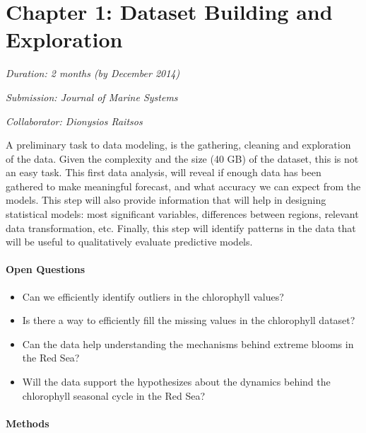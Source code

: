 \section{Chapter 1: Dataset Building and Exploration}

\noindent \emph{Duration: 2 months (by December 2014)}

\noindent \emph{Submission: Journal of Marine Systems}

\noindent \emph{Collaborator: Dionysios Raitsos}

\vspace{5mm}

A preliminary task to data modeling, is the gathering, cleaning and exploration
of the data. Given the complexity and the size (40 GB) of the dataset, this is not
an easy task. This first data analysis, will reveal if enough data has been
gathered to make meaningful forecast, and what accuracy we can expect from the
models. This step will also provide information that will help in designing
statistical models: most significant variables, differences between regions,
relevant data transformation, etc. Finally, this step will identify patterns in
the data that will be useful to qualitatively evaluate predictive models.

\paragraph{Open Questions}

\begin{itemize} 

\item Can we efficiently identify outliers in the chlorophyll values?

\item Is there a way to efficiently fill the missing values in the chlorophyll
dataset?

\item Can the data help understanding the mechanisms behind extreme blooms in
the Red Sea?

\item Will the data support the hypothesizes about the dynamics behind the
chlorophyll seasonal cycle in the Red Sea?

\end{itemize}

\paragraph{Methods}

